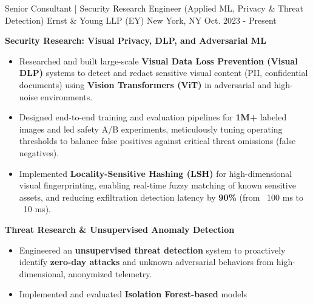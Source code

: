 \begin{cventries}

\cventry
  {Senior Consultant | Security Research Engineer (Applied ML, Privacy \& Threat Detection)}
  {Ernst \& Young LLP (EY)}
  {New York, NY}
  {Oct. 2023 - Present}
  {
    \begin{cvitems}
      \item {\textbf{Security Research: Visual Privacy, DLP, and Adversarial ML}}
        \begin{itemize}
          \item {
            Researched and built large-scale \textbf{Visual Data Loss Prevention (Visual DLP)} systems to 
            detect and redact sensitive visual content (PII, confidential documents) 
            using \textbf{Vision Transformers (ViT)} in adversarial and high-noise environments.
          }
          \item {
            Designed end-to-end training and evaluation pipelines for \textbf{1M+} labeled images and 
            led safety A/B experiments, meticulously tuning operating thresholds to 
            balance false positives against critical threat omissions (false negatives).
          }
          \item {
            Implemented \textbf{Locality-Sensitive Hashing (LSH)} for high-dimensional visual fingerprinting, 
            enabling real-time fuzzy matching of known sensitive assets, 
            and reducing exfiltration detection latency by \textbf{90\%} (from ~100 ms to ~10 ms).
          }
        \end{itemize}
      \vspace{0.5mm}
      \item \textbf{Threat Research \& Unsupervised Anomaly Detection}
        \begin{itemize}
          \item {
            Engineered an \textbf{unsupervised threat detection} system to proactively  
            identify \textbf{zero-day attacks} and unknown adversarial behaviors 
            from high-dimensional, anonymized telemetry.
          }
          \item {
            Implemented and evaluated \textbf{Isolation Forest-based} models 
}
\end{itemize}
\end{cvitems}}
\end{cventries}
